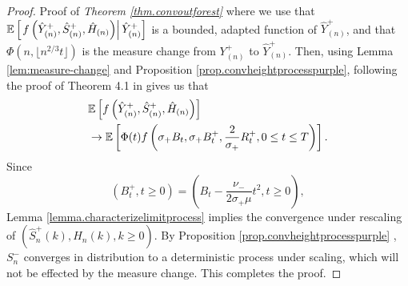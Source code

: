 \begin{proof}{Proof of \emph{Theorem \ref{thm.convoutforest}}}
where we use that ${\mathbb E}\left[\left. f\left(\hat{Y}^+_{(n)},\hat{S}^+_{(n)},  \hat{H}_{(n)}\right)\right|\hat{Y}^+_{(n)}\right]$ is a bounded, adapted function of $\hat{Y}^+_{(n)}$, and that $\Phi(n,\lfloor n^{2/3} t\rfloor)$ is the measure change from ${Y}^+_{(n)}$ to $\hat{Y}^+_{(n)}$. Then, using Lemma \ref{lem:measure-change} and Proposition \ref{prop.convheightprocesspurple}, following the proof of Theorem 4.1 in \cite{conchon--kerjanStableGraphMetric2020} gives us that 
\begin{align*}
    &{\mathbb E}\left[f\left(\hat{Y}^+_{(n)},\hat{S}^+_{(n)},  \hat{H}_{(n)}\right) \right]\\
    &\to {\mathbb E}\left[\Phi(t)f\left(\sigma_+ B_t,\sigma_+ B^+_t,\frac{2}{\sigma_+}R^+_t,0\leq t \leq T\right)\right].
\end{align*}
Since $$(B^+_t,t\geq 0)=\left(B_t-\frac{\nu_-}{2\sigma_+ \mu}t^2,t\geq 0\right),$$
Lemma \ref{lemma.characterizelimitprocess} implies the convergence under rescaling of $(\hat{S}^+_n(k),\hat{H}_n(k),k\geq 0)$. By Proposition \ref{prop.convheightprocesspurple} , $S^{-}_n$ converges in distribution to a deterministic process under scaling, which will not be effected by the measure change. This completes the proof. 
\end{proof}

